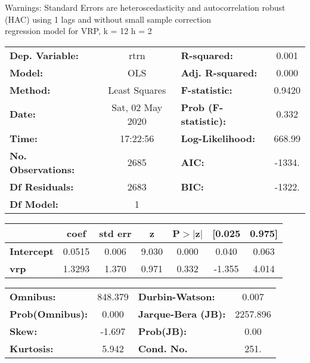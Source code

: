 Warnings: \newline
 [1] Standard Errors are heteroscedasticity and autocorrelation robust (HAC) using 1 lags and without small sample correction\\ 

regression model for VRP, k = 12 h = 2\begin{center}
\begin{tabular}{lclc}
\toprule
\textbf{Dep. Variable:}    &       rtrn       & \textbf{  R-squared:         } &     0.001   \\
\textbf{Model:}            &       OLS        & \textbf{  Adj. R-squared:    } &     0.000   \\
\textbf{Method:}           &  Least Squares   & \textbf{  F-statistic:       } &    0.9420   \\
\textbf{Date:}             & Sat, 02 May 2020 & \textbf{  Prob (F-statistic):} &    0.332    \\
\textbf{Time:}             &     17:22:56     & \textbf{  Log-Likelihood:    } &    668.99   \\
\textbf{No. Observations:} &        2685      & \textbf{  AIC:               } &    -1334.   \\
\textbf{Df Residuals:}     &        2683      & \textbf{  BIC:               } &    -1322.   \\
\textbf{Df Model:}         &           1      & \textbf{                     } &             \\
\bottomrule
\end{tabular}
\begin{tabular}{lcccccc}
                   & \textbf{coef} & \textbf{std err} & \textbf{z} & \textbf{P$> |$z$|$} & \textbf{[0.025} & \textbf{0.975]}  \\
\midrule
\textbf{Intercept} &       0.0515  &        0.006     &     9.030  &         0.000        &        0.040    &        0.063     \\
\textbf{vrp}       &       1.3293  &        1.370     &     0.971  &         0.332        &       -1.355    &        4.014     \\
\bottomrule
\end{tabular}
\begin{tabular}{lclc}
\textbf{Omnibus:}       & 848.379 & \textbf{  Durbin-Watson:     } &    0.007  \\
\textbf{Prob(Omnibus):} &   0.000 & \textbf{  Jarque-Bera (JB):  } & 2257.896  \\
\textbf{Skew:}          &  -1.697 & \textbf{  Prob(JB):          } &     0.00  \\
\textbf{Kurtosis:}      &   5.942 & \textbf{  Cond. No.          } &     251.  \\
\bottomrule
\end{tabular}
\end{center}

